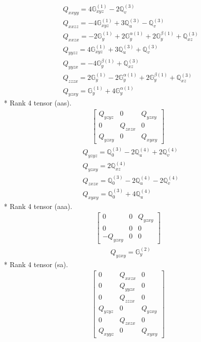\documentclass[fleqn,8pt,landscape]{jsarticle}
\begin{document}
\begin{align*}
& Q_{xxyy} = 4 \mathbb{G}_{xyz}^{(1)} - 2 \mathbb{Q}_{v}^{(3)} \\
& Q_{xxzz} = - 4 \mathbb{G}_{xyz}^{(1)} + 3 \mathbb{Q}_{u}^{(3)} - \mathbb{Q}_{v}^{(3)} \\
& Q_{xxzx} = - 2 \mathbb{G}_{y}^{(1)} + 2 \mathbb{G}_{y}^{\alpha(1)} + 2 \mathbb{G}_{y}^{\beta(1)} + \mathbb{Q}_{xz}^{(3)} \\
& Q_{yyzz} = 4 \mathbb{G}_{xyz}^{(1)} + 3 \mathbb{Q}_{u}^{(3)} + \mathbb{Q}_{v}^{(3)} \\
& Q_{yyzx} = - 4 \mathbb{G}_{y}^{\beta(1)} + \mathbb{Q}_{xz}^{(3)} \\
& Q_{zzzx} = 2 \mathbb{G}_{y}^{(1)} - 2 \mathbb{G}_{y}^{\alpha(1)} + 2 \mathbb{G}_{y}^{\beta(1)} + \mathbb{Q}_{xz}^{(3)} \\
& Q_{yzxy} = \mathbb{G}_{y}^{(1)} + 4 \mathbb{G}_{y}^{\alpha(1)}
\end{align*}
* Rank 4 tensor (aas).
\begin{align*}
\begin{bmatrix} Q_{yzyz} & 0 & Q_{yzxy} \\ 0 & Q_{zxzx} & 0 \\ Q_{yzxy} & 0 & Q_{xyxy} \end{bmatrix}
\end{align*}
\begin{align*}
& Q_{yzyz} = \mathbb{Q}_{0}^{(3)} - 2 \mathbb{Q}_{u}^{(4)} + 2 \mathbb{Q}_{v}^{(4)} \\
& Q_{yzxy} = 2 \mathbb{Q}_{xz}^{(4)} \\
& Q_{zxzx} = \mathbb{Q}_{0}^{(3)} - 2 \mathbb{Q}_{u}^{(4)} - 2 \mathbb{Q}_{v}^{(4)} \\
& Q_{xyxy} = \mathbb{Q}_{0}^{(3)} + 4 \mathbb{Q}_{u}^{(4)}
\end{align*}
* Rank 4 tensor (aaa).
\begin{align*}
\begin{bmatrix} 0 & 0 & Q_{yzxy} \\ 0 & 0 & 0 \\ - Q_{yzxy} & 0 & 0 \end{bmatrix}
\end{align*}
\begin{align*}
& Q_{yzxy} = \mathbb{G}_{y}^{(2)}
\end{align*}
* Rank 4 tensor (sa).
\begin{align*}
\begin{bmatrix} 0 & Q_{xxzx} & 0 \\ 0 & Q_{yyzx} & 0 \\ 0 & Q_{zzzx} & 0 \\ Q_{yzyz} & 0 & Q_{yzxy} \\ 0 & Q_{zxzx} & 0 \\ Q_{xyyz} & 0 & Q_{xyxy} \end{bmatrix}
\end{align*}
\end{document}
